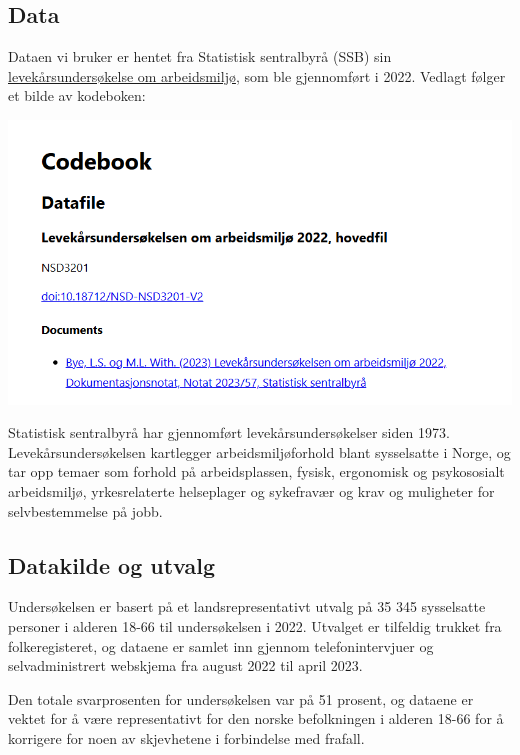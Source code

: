 \documentclass[
  12pt,
  a4paper,
  DIV=11,
  numbers=noendperiod]{scrartcl}
\begin{document}
\subsection{Data}\label{data}

Dataen vi bruker er hentet fra Statistisk sentralbyrå (SSB) sin
\href{https://www.ssb.no/arbeid-og-lonn/arbeidsmiljo-sykefravaer-og-arbeidskonflikter/artikler/levekarsundersokelsen-om-arbeidsmiljo-2022}{levekårsundersøkelse
om arbeidsmiljø}, som ble gjennomført i 2022. Vedlagt følger et bilde av
kodeboken:

\includegraphics{dokumentobjekter/bilder/codebook.png}

Statistisk sentralbyrå har gjennomført levekårsundersøkelser siden 1973.
Levekårsundersøkelsen kartlegger arbeidsmiljøforhold blant sysselsatte i
Norge, og tar opp temaer som forhold på arbeidsplassen, fysisk,
ergonomisk og psykososialt arbeidsmiljø, yrkesrelaterte helseplager og
sykefravær og krav og muligheter for selvbestemmelse på jobb.

\subsection{Datakilde og utvalg}\label{datakilde-og-utvalg}

Undersøkelsen er basert på et landsrepresentativt utvalg på 35 345
sysselsatte personer i alderen 18-66 til undersøkelsen i 2022. Utvalget
er tilfeldig trukket fra folkeregisteret, og dataene er samlet inn
gjennom telefonintervjuer og selvadministrert webskjema fra august 2022
til april 2023.

Den totale svarprosenten for undersøkelsen var på 51 prosent, og dataene
er vektet for å være representativt for den norske befolkningen i
alderen 18-66 for å korrigere for noen av skjevhetene i forbindelse med
frafall.
\end{document}
